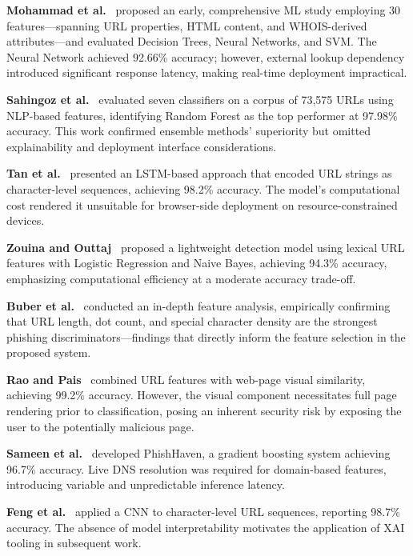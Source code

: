 \documentclass[conference]{IEEEtran}
\begin{document}
\textbf{Mohammad et al.}~\cite{mohammad2014} proposed an early, 
comprehensive ML study employing 30 features—spanning URL properties, 
HTML content, and WHOIS-derived attributes—and evaluated Decision Trees, 
Neural Networks, and SVM. The Neural Network achieved 92.66\% accuracy; 
however, external lookup dependency introduced significant response 
latency, making real-time deployment impractical.

\textbf{Sahingoz et al.}~\cite{sahingoz2019} evaluated seven classifiers 
on a corpus of 73,575 URLs using NLP-based features, identifying Random 
Forest as the top performer at 97.98\% accuracy. This work confirmed 
ensemble methods' superiority but omitted explainability and deployment 
interface considerations.

\textbf{Tan et al.}~\cite{tan2021} presented an LSTM-based approach that 
encoded URL strings as character-level sequences, achieving 98.2\% accuracy. 
The model's computational cost rendered it unsuitable for 
browser-side deployment on resource-constrained devices.

\textbf{Zouina and Outtaj}~\cite{zouina2017} proposed a lightweight 
detection model using lexical URL features with Logistic Regression and 
Naive Bayes, achieving 94.3\% accuracy, emphasizing computational 
efficiency at a moderate accuracy trade-off.

\textbf{Buber et al.}~\cite{buber2018} conducted an in-depth feature 
analysis, empirically confirming that URL length, dot count, and special 
character density are the strongest phishing discriminators—findings that 
directly inform the feature selection in the proposed system.

\textbf{Rao and Pais}~\cite{rao2019} combined URL features with web-page 
visual similarity, achieving 99.2\% accuracy. However, the visual 
component necessitates full page rendering prior to classification, 
posing an inherent security risk by exposing the user to the potentially 
malicious page.

\textbf{Sameen et al.}~\cite{sameen2020} developed PhishHaven, a gradient 
boosting system achieving 96.7\% accuracy. Live DNS resolution was 
required for domain-based features, introducing variable and 
unpredictable inference latency.

\textbf{Feng et al.}~\cite{feng2021} applied a CNN to character-level 
URL sequences, reporting 98.7\% accuracy. The absence of model 
interpretability motivates the application of XAI tooling in 
subsequent work.
\end{document}
